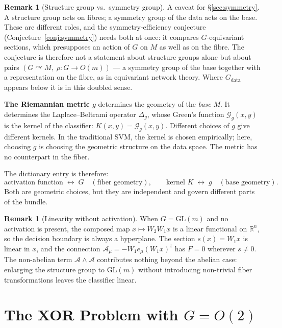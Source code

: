 \documentclass[11pt, a4paper]{article}
\theoremstyle{plain}
\theoremstyle{definition}
\newtheorem{remark}[theorem]{Remark}
\newcommand{\R}{\mathbb{R}}
\newcommand{\GL}{\mathrm{GL}}
\newcommand{\Sig}{\mathcal{A}}
\newcommand{\Gr}{\mathcal{G}}   %
\begin{document}
\begin{remark}[Structure group vs.\ symmetry group]\label{rem:two-roles}
A caveat for \S\ref{sec:symmetry}. A structure group acts on fibres; a symmetry
group of the data acts on the base. These are different roles, and the
symmetry-efficiency conjecture (Conjecture~\ref{conj:symmetry}) needs both at
once: it compares $G$-equivariant sections, which presupposes an action of $G$
on $M$ as well as on the fibre. The conjecture is therefore not a statement
about structure groups alone but about pairs $(G \curvearrowright M,\;
\rho: G \to O(m))$ --- a symmetry group of the base together with a
representation on the fibre, as in equivariant network theory. Where
$G_{\mathrm{data}}$ appears below it is in this doubled sense.
\end{remark}

\textbf{The Riemannian metric $g$} determines the geometry of the \emph{base} $M$.
It determines
the Laplace--Beltrami operator $\Delta_g$, whose Green's function $\Gr_g(x,y)$
is the kernel of the classifier: $K(x,y) = \Gr_g(x,y)$. Different choices of $g$
give different kernels. In the traditional SVM, the kernel is chosen empirically;
here, choosing $g$ is choosing the geometric structure on the data space. The
metric has no counterpart in the fiber.

The dictionary entry is therefore:
\[
  \text{activation function} \;\longleftrightarrow\; G \quad(\text{fiber geometry}),
  \qquad
  \text{kernel } K \;\longleftrightarrow\; g \quad(\text{base geometry}).
\]
Both are geometric choices, but they are independent and govern different parts
of the bundle.

\begin{remark}[Linearity without activation]\label{rem:linear}
When $G = \GL(m)$ and no activation is present, the composed map $x \mapsto
W_2 W_1 x$ is a linear functional on $\R^n$, so the decision boundary is always
a hyperplane. The section $s(x) = W_1 x$ is linear in $x$, and the connection
$\Sig_\mu = -W_1 e_\mu (W_1 x)^\dagger$ has $F = 0$ wherever $s \neq 0$. The
non-abelian term $\Sig\wedge\Sig$ contributes nothing beyond the abelian case:
enlarging the structure group to $\GL(m)$ without introducing non-trivial fiber
transformations leaves the classifier linear.
\end{remark}

\section{The XOR Problem with $G = O(2)$}\label{sec:xor}
\end{document}
